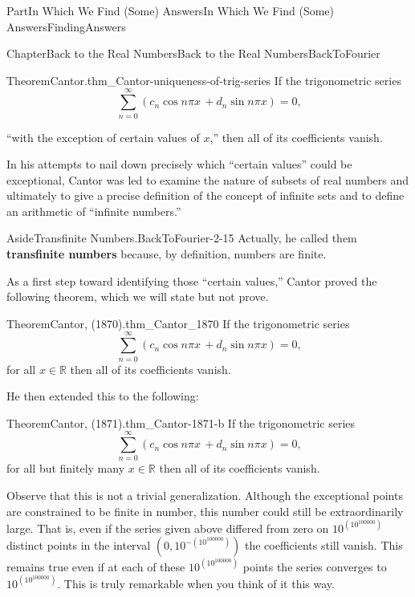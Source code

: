 \documentclass[oneside,10pt,]{book}
\newcommand{\terminology}[1]{\textbf{#1}}
\numberwithin{equation}{part}
\newcommand{\RR}{\mathbb {R}}
\begin{document}
\begin{partptx}{Part}{In Which We Find (Some) Answers}{}{In Which We Find (Some) Answers}{}{}{FindingAnswers}
\begin{chapterptx}{Chapter}{Back to the Real Numbers}{}{Back to the Real Numbers}{}{}{BackToFourier}
\begin{introduction}{}
\begin{theorem}{Theorem}{Cantor.}{}{thm_Cantor-uniqueness-of-trig-series}
 If the trigonometric series%
\begin{equation*}
\sum_{n=0}^\infty\left(c_n\cos n\pi  x\,+d_n\sin n\pi x\right) = 0\text{,}
\end{equation*}
%
\par
``with the exception of certain values of \(x\),'' then all of its coefficients vanish.%
\end{theorem}
In his attempts to nail down precisely which ``certain values'' could be exceptional, Cantor was led to examine the nature of subsets of real numbers and ultimately to give a precise definition of the concept of infinite sets and to define an arithmetic of ``infinite numbers.''%
\begin{aside}{Aside}{Transfinite Numbers.}{BackToFourier-2-15}%
Actually, he called them \terminology{transfinite numbers} because, by definition, numbers are finite.%
\end{aside}
As a first step toward identifying those ``certain values,'' Cantor proved the following theorem, which we will state but not prove.%
\begin{theorem}{Theorem}{Cantor, (1870).}{}{thm_Cantor_1870}%
%
%
If the trigonometric series%
\begin{equation*}
\sum_{n=0}^\infty\left(c_n\cos n\pi  x\,+d_n\sin n\pi x\right) = 0\text{,}
\end{equation*}
for all \(x\in\RR\) then all of its coefficients vanish.%
\end{theorem}
He then extended this to the following:%
\begin{theorem}{Theorem}{Cantor, (1871).}{}{thm_Cantor-1871-b}%
%
%
If the trigonometric series%
\begin{equation*}
\sum_{n=0}^\infty\left(c_n\cos n\pi x\,+d_n\sin n\pi
x\right) = 0 \text{,}
\end{equation*}
for all but finitely many \(x\in\RR\) then all of its coefficients vanish.%
\end{theorem}
Observe that this is not a trivial generalization.  Although the exceptional points are constrained to be finite in number, this number could still be extraordinarily large.  That is, even if the series given above differed from zero on \(10^{\left(10^{100000}\right)}\) distinct points in the interval \(\left(0, 10^{-\left(10^{100000}\right)}\right)\) the coefficients still vanish.  This remains true even if at each of these \(10^{\left(10^{100000}\right)}\) points the series converges to \(10^{\left(10^{100000}\right)}\).  This is truly remarkable when you think of it this way.%

\end{introduction}
\end{chapterptx}
\end{partptx}
\end{document}
